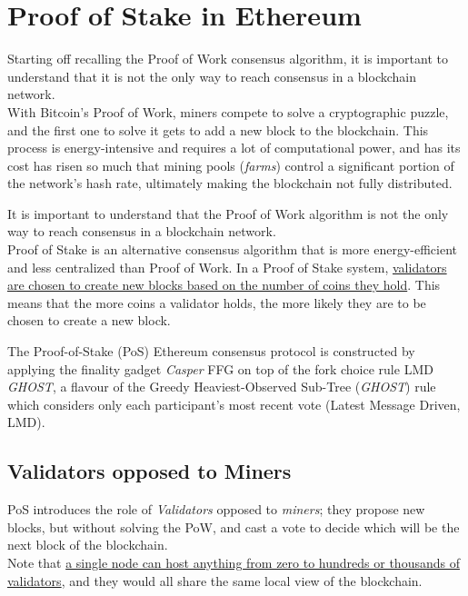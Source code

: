\chapter{Proof of Stake in Ethereum}

Starting off recalling the Proof of Work consensus algorithm, it is important to understand that it is not the only way to reach consensus in a blockchain network.\\
With Bitcoin's Proof of Work, miners compete to solve a cryptographic puzzle, and the first one to solve it gets to add a new block to the blockchain. This process is energy-intensive and requires a lot of computational power, and has its cost has risen so much that mining pools (\textit{farms}) control a significant portion of the network's hash rate, ultimately making the blockchain not fully distributed.

It is important to understand that the Proof of Work algorithm is not the only way to reach consensus in a blockchain network.\\
Proof of Stake is an alternative consensus algorithm that is more energy-efficient and less centralized than Proof of Work. In a Proof of Stake system, \ul{validators are chosen to create new blocks based on the number of coins they hold}. This means that the more coins a validator holds, the more likely they are to be chosen to create a new block.

\begin{definition}
   The Proof-of-Stake (PoS) Ethereum consensus protocol is constructed by applying the finality gadget \textit{Casper} FFG on top of the fork choice rule LMD \textit{GHOST}, a flavour of the Greedy Heaviest-Observed Sub-Tree (\textit{GHOST}) rule which considers only each participant's most recent vote (Latest
   Message Driven, LMD).
\end{definition}
\section{Validators opposed to Miners}

PoS introduces the role of \textit{Validators} opposed to \textit{miners}; they propose new blocks, but without solving the PoW, and cast a vote to decide which will be the next block of the blockchain.\\
Note that \ul{a single node can host anything from zero to hundreds or thousands of validators}, and they would all share the same local view of the blockchain. 


